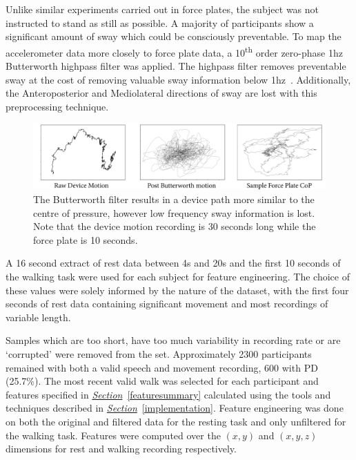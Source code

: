 \documentclass[12pt, twoside]{book}
\begin{document}
Unlike similar experiments carried out in force plates, the subject was not instructed to stand as still as possible. A majority of participants show a significant amount of sway which could be consciously preventable. To map the accelerometer data more closely to force plate data, a 10\textsuperscript{th} order zero-phase 1hz Butterworth highpass filter was applied. The highpass filter removes preventable sway at the cost of removing valuable sway information below 1hz~\cite{swayspectral}. Additionally, the Anteroposterior and Mediolateral directions of sway are lost with this preprocessing technique.

\begin{figure}[h]
	\label{butterworth}
	\centering\centerline{\includegraphics[width=1.2\linewidth]{butterworth.png}}
	\caption{The Butterworth filter results in a device path more similar to the centre of pressure, however low frequency sway information is lost. Note that the device motion recording is 30 seconds long while the force plate is 10 seconds.}
\end{figure}

A 16 second extract of rest data between 4s and 20s and the first 10 seconds of the walking task were used for each subject for feature engineering. The choice of these values were solely informed by the nature of the dataset, with the first four seconds of rest data containing significant movement and most recordings of variable length.

Samples which are too short, have too much variability in recording rate or are `corrupted' were removed from the set. Approximately 2300 participants remained with both a valid speech and movement recording, 600 with PD (25.7\%). The most recent valid walk was selected for each participant and features specified in \textit{\hyperref[featuresummary]{Section}}~\ref{featuresummary} calculated using the tools and techniques described in \textit{\hyperref[implementation]{Section}}~\ref{implementation}.  Feature engineering was done on both the original and filtered data for the resting task and only unfiltered for the walking task. Features were computed over the $(x,y)$ and $(x,y,z)$ dimensions for rest and walking recording respectively.
\end{document}

